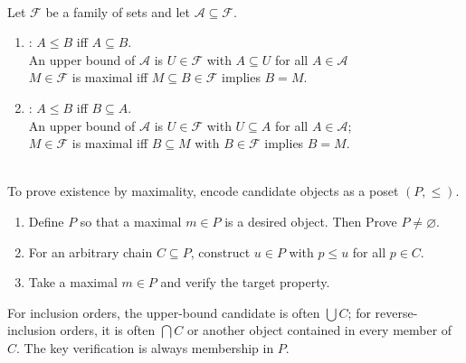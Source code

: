 \begin{definition} \label{def:inclusion-and-containment-orders-for-zorn} \\
Let $\mathcal{F}$ be a family of sets and let $\mathcal{A}\subseteq\mathcal{F}$.
\begin{enumerate}[label=(\roman*)]
\setlength{\itemsep}{0pt}
\item {}: $A\leq B$ iff $A\subseteq B$.\\
An upper bound of $\mathcal{A}$ is $U\in\mathcal{F}$ with $A\subseteq U$ for all $A\in\mathcal{A}$\\
$M\in\mathcal{F}$ is maximal iff $M\subseteq B\in\mathcal{F}$ implies $B=M$.
\item {}: $A\leq B$ iff $B\subseteq A$.\\
An upper bound of $\mathcal{A}$ is $U\in\mathcal{F}$ with $U\subseteq A$ for all $A\in\mathcal{A}$;\\
$M\in\mathcal{F}$ is maximal iff $B\subseteq M$ with $B\in\mathcal{F}$ implies $B=M$.
\end{enumerate}
\end{definition}

\begin{method} \label{meth:zorn-maximality-template} \\
To prove existence by maximality, encode candidate objects as a poset $(P,\leq)$.
\begin{enumerate}[label=(\roman*)]
\setlength{\itemsep}{0pt}
\item Define $P$ so that a maximal $m\in P$ is a desired object. Then Prove $P\neq\varnothing$.
\item For an arbitrary chain $C\subseteq P$, construct $u\in P$ with $p\leq u$ for all $p\in C$.
\item Take a maximal $m\in P$ and verify the target property.
\end{enumerate}
For inclusion orders, the upper-bound candidate is often $\bigcup C$; for reverse-inclusion orders, it is often $\bigcap C$ or another object contained in every member of $C$. The key verification is always membership in $P$.
\end{method}
